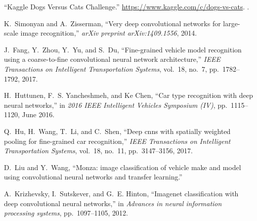 \documentclass[conference]{IEEEtran}
\begin{document}
\addtolength{\textheight}{-15cm}   %




\begin{thebibliography}{99}
``{Kaggle Dogs Versus Cats Challenge}.''
  \url{https://www.kaggle.com/c/dogs-vs-cats}.
\newblock [Accessed: 2020-03-01].

K.~Simonyan and A.~Zisserman, ``Very deep convolutional networks for
  large-scale image recognition,'' {\em arXiv preprint arXiv:1409.1556}, 2014.

J.~{Fang}, Y.~{Zhou}, Y.~{Yu}, and S.~{Du}, ``Fine-grained vehicle model
  recognition using a coarse-to-fine convolutional neural network
  architecture,'' {\em IEEE Transactions on Intelligent Transportation
  Systems}, vol.~18, no.~7, pp.~1782--1792, 2017.

H.~{Huttunen}, F.~S. {Yancheshmeh}, and {Ke Chen}, ``Car type recognition with
  deep neural networks,'' in {\em 2016 IEEE Intelligent Vehicles Symposium
  (IV)}, pp.~1115--1120, June 2016.
  
Q.~{Hu}, H.~{Wang}, T.~{Li}, and C.~{Shen}, ``Deep cnns with spatially weighted
  pooling for fine-grained car recognition,'' {\em IEEE Transactions on
  Intelligent Transportation Systems}, vol.~18, no.~11, pp.~3147--3156, 2017.
  
D.~Liu and Y.~Wang, ``Monza: image classification of vehicle make and model
  using convolutional neural networks and transfer learning.''
 
A.~Krizhevsky, I.~Sutskever, and G.~E. Hinton, ``Imagenet classification with
  deep convolutional neural networks,'' in {\em Advances in neural information
  processing systems}, pp.~1097--1105, 2012.
  

\end{thebibliography}
\end{document}
